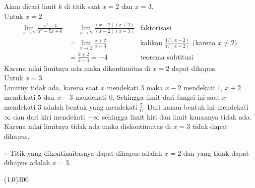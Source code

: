 \begin{enumerate}[leftmargin=*, label={\arabic*}.]
\begin{enumerate}[label={\alph*}.]
Akan dicari limit $k$ di titik saat $x=2$ dan $x=3$.\\
Untuk $x=2$
\begin{align*}
    \lim_{x \to 2} \frac{x^{2}-4}{x^{2}-5x+6}
    &= \lim_{x \to 2} \frac{(x-2)(x+2)}{(x-2)(x-3)}
    &\text{faktorisasi}\\
    &= \lim_{x \to 2} \frac{x+2}{x-3}
    &\text{kalikan $\frac{1/(x-2)}{1/(x-2)}$ (karena $x \neq 2$)}\\
    &= \frac{2+2}{2-3} = -4
    &\text{teorema subtitusi}
\end{align*}
Karena nilai limitnya ada maka dikontinuitas di $x=2$ dapat dihapus.\\
Untuk $x=3$\\
Limitny tidak ada, karena saat $x$ mendekati $3$ maka $x-2$ mendekati $1$, 
$x+2$ mendekati $5$ dan $x-3$ mendekati 0. Sehingga limit dari fungsi ini 
saat $x$ mendekati $3$ adalah bentuk yang mendekati $\frac{5}{0}$. Dari kanan 
bentuk ini mendekati $\infty$ dan dari kiri mendekati $-\infty$ sehingga limit 
kiri dan limit kanannya tidak ada.\\
Karena nilai limitnya tidak ada maka diskontinuitas di $x=3$ tidak dapat dihapus.

$\therefore$ Titik yang dikontinuitasnya dapat dihapus adalah $x=2$ dan yang tidak 
dapat dihapus adalah $x=3$.
\begin{center}
    \line(1,0){300}
\end{center}
\end{enumerate}
\end{enumerate}
